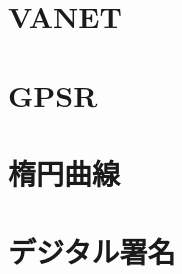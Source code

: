\section{\textbf{VANET}}

\section{\textbf{GPSR}}

\section{\textbf{楕円曲線}}

\section{\textbf{デジタル署名}}


